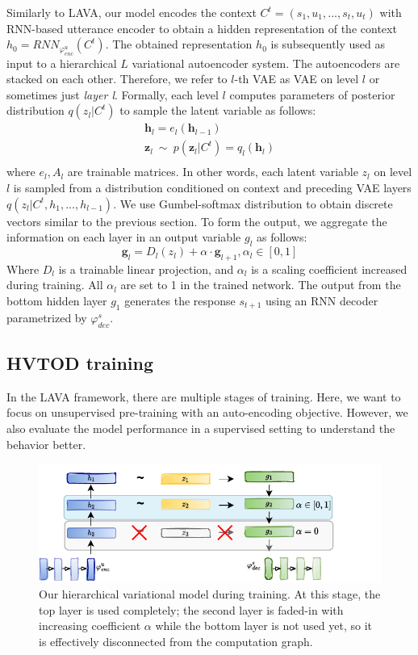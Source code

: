 Similarly to LAVA, our model encodes the context $C^t = (s_1,u_1,...,s_t,u_t)$ with RNN-based utterance encoder to obtain a hidden representation of the context $h_0 = RNN_{\varphi_{enc}^u} (C^t)$.
The obtained representation $h_0$ is subsequently used as input to a hierarchical $L$ variational autoencoder system.
The autoencoders are stacked on each other.
Therefore, we refer to $l$-th VAE as VAE on level $l$ or sometimes just \emph{layer l}.
Formally, each level $l$ computes parameters of posterior distribution $q(z_l|C^t)$ to sample the latent variable as follows:
\begin{equation}
\begin{split}    
    \mathbf{h}_l = e_l(\mathbf{h}_{l-1}) \\
    \mathbf{z}_l~\mathtt{\sim}~p(\mathbf{z}_l|C^t) = q_l(\mathbf{h}_l) \\
\end{split}
\end{equation}
where $e_l, A_l$ are trainable matrices.
In other words, each latent variable $z_l$ on level $l$ is sampled from a  distribution conditioned on context and preceding VAE layers $q(z_l|C^t,h_1,...,h_{l-1})$.
We use Gumbel-softmax distribution to obtain discrete vectors similar to the previous section.
To form the output, we aggregate the information on each layer in an output variable $g_l$ as follows:
\begin{equation}
\mathbf{g}_l = D_l(z_l) + \alpha \cdot \mathbf{g}_{l+1}, \alpha_l \in [0, 1]
\end{equation}
Where $D_l$ is a trainable linear projection, and  $\alpha_l$ is a scaling coefficient increased during training. All $\alpha_l$ are set to 1 in the trained network.
The output from the bottom hidden layer $g_1$ generates the response $s_{t+1}$  using an RNN decoder parametrized by $\varphi^s_{dec}$.

\subsection{HVTOD training}
In the LAVA framework, there are multiple stages of training.
Here, we want to focus on unsupervised pre-training with an auto-encoding objective.
However, we also evaluate the model performance in a supervised setting to understand the behavior better.
\begin{figure}[h]
    \centering
    \includegraphics[width=\textwidth]{images/HLAVA-fadein.pdf}
    \caption{Our hierarchical variational model during training. At this stage, the top layer is used completely; the second layer is faded-in with increasing coefficient $\alpha$ while the bottom layer is not used yet, so it is effectively disconnected from the computation graph.}
    \label{05:fig:HVTOD-fadein}
\end{figure}

